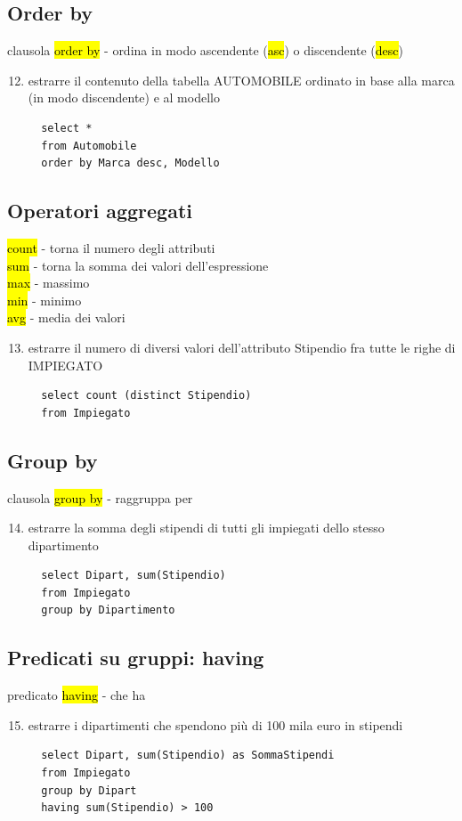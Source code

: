 \documentclass[a4paper]{article}
\begin{document}
\subsection{Order by}
clausola \hl{order by} - ordina in modo ascendente (\hl{asc}) o discendente (\hl{desc})
\begin{enumerate}[leftmargin=*]
  \setcounter{enumi}{11}
  \item estrarre il contenuto della tabella AUTOMOBILE ordinato in base alla marca (in modo discendente) e al modello
  \begin{verbatim}
  select *
  from Automobile
  order by Marca desc, Modello
  \end{verbatim}
\end{enumerate}

\subsection{Operatori aggregati}
\hl{count} - torna il numero degli attributi\\
\hl{sum} - torna la somma dei valori dell’espressione\\
\hl{max} - massimo\\
\hl{min} - minimo\\
\hl{avg} - media dei valori
\begin{enumerate}[leftmargin=*]
  \setcounter{enumi}{12}
  \item estrarre il numero di diversi valori dell’attributo Stipendio fra tutte le righe di IMPIEGATO
  \begin{verbatim}
  select count (distinct Stipendio)
  from Impiegato
  \end{verbatim}
\end{enumerate}

\subsection{Group by}
clausola \hl{group by} - raggruppa per
\begin{enumerate}[leftmargin=*]
  \setcounter{enumi}{13}
  \item estrarre la somma degli stipendi di tutti gli impiegati dello stesso dipartimento
  \begin{verbatim}
  select Dipart, sum(Stipendio)
  from Impiegato
  group by Dipartimento
  \end{verbatim}
\end{enumerate}

\subsection{Predicati su gruppi: having}
predicato \hl{having} - che ha
\begin{enumerate}[leftmargin=*]
  \setcounter{enumi}{14}
  \item estrarre i dipartimenti che spendono più di 100 mila euro in stipendi
  \begin{verbatim}
  select Dipart, sum(Stipendio) as SommaStipendi
  from Impiegato
  group by Dipart
  having sum(Stipendio) > 100
  \end{verbatim}
\end{enumerate}
\end{document}
